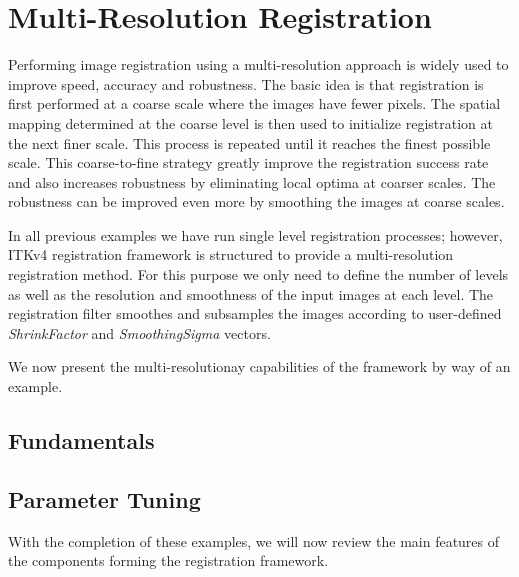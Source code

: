 \section{Multi-Resolution Registration}
\label{sec:MultiResolutionRegistration}
Performing image registration using a multi-resolution approach is widely used
to improve speed, accuracy and robustness. The basic idea is that registration
is first performed at a coarse scale where the images have fewer pixels.
The spatial mapping determined at the coarse level is then used to initialize
registration at the next finer scale. This process is repeated until it
reaches the finest possible scale. This coarse-to-fine strategy greatly
improve the registration success rate and also increases robustness
by eliminating local optima at coarser scales. The robustness can be improved
even more by smoothing the images at coarse scales.

In all previous examples we have run single level registration processes; however,
ITKv4 registration framework is structured to provide a multi-resolution registration
method. For this purpose we only need to define the number of levels as well as the
resolution and smoothness of the input images at each level. The registration filter
smoothes and subsamples the images according to user-defined \emph{ShrinkFactor} and
\emph{SmoothingSigma} vectors.

We now present the multi-resolutionay capabilities of the framework by
way of an example.

\subsection{Fundamentals}
\ifitkFullVersion

\fi

\subsection{Parameter Tuning}
\ifitkFullVersion

\fi

With the completion of these examples, we will now review the main
features of the components forming the registration framework.


\clearpage

